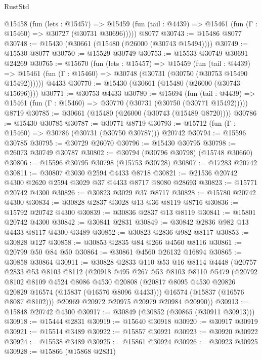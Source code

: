 \begin{lexlean}{RustStd}
\begin{coremodule}
{\begin{coremodule}
{{{{{{{{{{{{{{{{{{{{{{{{{{{{{{{{{{{{{{{{{{{{{{{{{{{{{{{{{{{{    @15458
      (fun (lets : @15457) =>
      @15459 (fun (tail : @4439) => @15461 (fun (Γ : @15460) => @30727 (@30731 @30696)))))
    @8077
@30743 := @15486 @8077
@30748 := @15430 (@30661 (@15480 (@26000 (@30743 @15494))))
@30749 := @15530 @8077
@30750 := @15529 @30749
@30753 := @15533 @30749 @30691 @24269
@30765 := @15670
    (fun (lets : @15457) =>
    @15459
      (fun (tail : @4439) =>
      @15461 (fun (Γ : @15460) => @30748 (@30731 (@30750 (@30753 @15490 @15492))))))
    @4433
@30770 := @15430 (@30661 (@15480 (@26000 (@30743 @15696))))
@30771 := @30753 @4433
@30780 := @15694
    (fun (tail : @4439) => @15461 (fun (Γ : @15460) => @30770 (@30731 (@30750 (@30771 @15492)))))
    @8719
@30785 := @30661 (@15480 (@26000 (@30743 (@15489 @8720))))
@30786 := @15430 @30785
@30787 := @30771 @8719
@30793 := @15712 (fun (Γ : @15460) => @30786 (@30731 (@30750 @30787))) @20742
@30794 := @15596 @30785
@30795 := @30729 @26070
@30796 := @15430 @30795
@30798 := @26073 @30749 @30787
@30802 := @30794 (@30796 @30798) (@15748 @30660)
@30806 := @15596 @30795 @30798 (@15753 @30728)
@30807 := @17283 @20742
@30811 := @30807 @3030 @2594 @4433 @8718
@30821 := @21536 @20742 @4300 @2620 @2594 @3029 @37 @4433 @8717 @8080 @28693
@30823 := @15771 @20742 @4300
@30826 := @30823 @3029 @37 @8717
@30828 := @15780 @20742 @4300
@30834 := @30828 @2837 @3028 @13 @36 @8119 @8716
@30836 := @15792 @20742 @4300
@30839 := @30836 @2837 @13 @8119
@30841 := @15801 @20742 @4300
@30842 := @30841 @2831
@30849 := @30842 @2836 @982 @13 @4433 @8117 @4300 @3489
@30852 := @30823 @2836 @982 @8117
@30853 := @30828 @127
@30858 := @30853 @2835 @84 @266 @4560 @8116
@30861 := @20799 @50 @84 @50
@30864 := @30861 @4560 @26132 @16894
@30865 := @30858 @30864
@30911 := @30828
    @2833
    @110
    @53
    @16
    @8114
    @4448
    (@20757
      @2833
      @53
      @8103
      @8112
      (@20918
        @495
        @267
        @53
        @8103
        @8110
        @5479
        (@20792
          @8102
          @8109
          @4524
          @8086
          @4530
          @20808
          (@20817 @8095 @4530 @20826 @20829 @16574 (@15837 (@16576 @8096 @4433)))
          @16574
          (@15837 (@16576 @8087 @8102)))
        @20969
        @20972
        @20975
        @20979
        @20984
        @20990))
@30913 := @15848 @20742 @4300
@30917 := @30849 (@30852 (@30865 (@30911 @30913)))
@30918 := @15444 @2831
@30919 := @15640 @30918
@30920 := @30917 @30919
@30921 := @15514 @3489
@30922 := @15857 @30921
@30923 := @30920 @30922
@30924 := @15538 @3489
@30925 := @15861 @30924
@30926 := @30923 @30925
@30928 := @15866 (@15868 @2831)
}}}}}}}}}}}}}}}}}}}}}}}}}}}}}}}}}}}}}}}}}}}}}}}}}}}}}}}}}}}}
\end{coremodule}}
\end{coremodule}
\end{lexlean}
